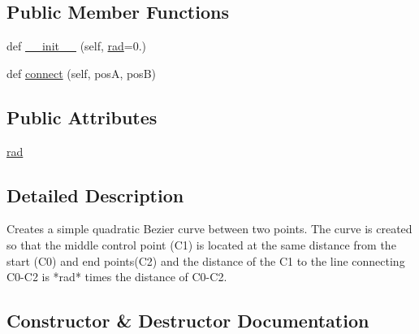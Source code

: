 \subsection*{Public Member Functions}
\begin{DoxyCompactItemize}
\item 
def \hyperlink{classmatplotlib_1_1patches_1_1ConnectionStyle_1_1Arc3_a7ccb2bfc6339a9577bfe1c030f064e8d}{\+\_\+\+\_\+init\+\_\+\+\_\+} (self, \hyperlink{classmatplotlib_1_1patches_1_1ConnectionStyle_1_1Arc3_a62efd93c1821044e0de684a863df80a2}{rad}=0.)
\item 
def \hyperlink{classmatplotlib_1_1patches_1_1ConnectionStyle_1_1Arc3_a25ec7bda1c4ed13e51df959432a2bf13}{connect} (self, posA, posB)
\end{DoxyCompactItemize}
\subsection*{Public Attributes}
\begin{DoxyCompactItemize}
\item 
\hyperlink{classmatplotlib_1_1patches_1_1ConnectionStyle_1_1Arc3_a62efd93c1821044e0de684a863df80a2}{rad}
\end{DoxyCompactItemize}


\subsection{Detailed Description}
\begin{DoxyVerb}Creates a simple quadratic Bezier curve between two
points. The curve is created so that the middle control point
(C1) is located at the same distance from the start (C0) and
end points(C2) and the distance of the C1 to the line
connecting C0-C2 is *rad* times the distance of C0-C2.
\end{DoxyVerb}
 

\subsection{Constructor \& Destructor Documentation}
\mbox{\label{classmatplotlib_1_1patches_1_1ConnectionStyle_1_1Arc3_a7ccb2bfc6339a9577bfe1c030f064e8d}} 
